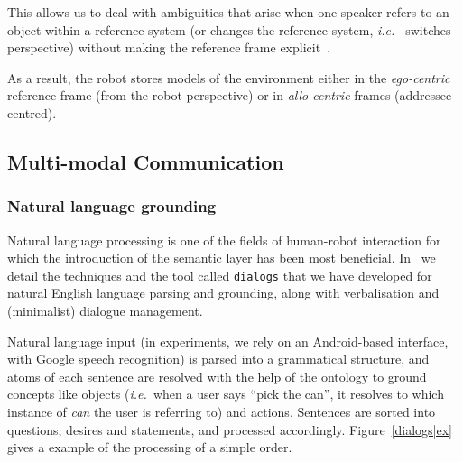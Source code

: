 \documentclass[preprint,3p,times]{elsarticle}
\newcommand{\ie}{{\textit{i.e.\ }}}
\begin{document}
This allows us to deal with ambiguities that arise when one speaker refers to
an object within a reference system (or changes the reference system, \ie
switches perspective) without making the reference frame
explicit~\cite{Breazeal2006, Ros2010}.

As a result, the robot stores models of the environment either in the
\emph{ego-centric} reference frame (from the robot perspective) or in 
\emph{allo-centric} frames (addressee-centred).

\subsection{Multi-modal Communication}
\label{sect|com}

\subsubsection{Natural language grounding}

Natural language processing is one of the fields of human-robot interaction
for which the introduction of the semantic layer has been most beneficial.
In~\cite{Lemaignan2011a} we detail the techniques and the tool called
\texttt{dialogs} that we have developed for natural English language parsing and
grounding, along with verbalisation and (minimalist) dialogue management.

Natural language input (in experiments, we rely on an Android-based interface,
with Google speech recognition) is parsed into a grammatical structure, and
atoms of each sentence are resolved with the help of the ontology to ground
concepts like objects (\ie when a user says ``pick the can'', it resolves to which
instance of \emph{can} the user is referring to) and actions. Sentences are
sorted into questions, desires and statements, and processed accordingly.
Figure~\ref{dialogs|ex} gives a example of the processing of a simple order.
\end{document}
